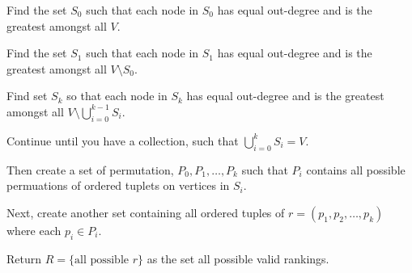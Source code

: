 \begin{soln}
	Find the set \(S_0\) such that each node in \(S_0\) has equal out-degree and is the greatest amongst all \(V\).

	Find the set \(S_1\) such that each node in \(S_1\) has equal out-degree and is the greatest amongst all \(V \setminus S_0\).

	Find set \(S_k\) so that each node in \(S_k\) has equal out-degree and is the greatest amongst all \(V \setminus \bigcup_{i=0}^{k-1}S_i\).

	Continue until you have a collection, such that \(\bigcup_{i = 0}^{k} S_i = V\).

	Then create a set of permutation, \(P_0, P_1, \dots, P_k\) such that \(P_i\) contains all possible permuations of ordered tuplets on vertices in \(S_i\).

	Next, create another set containing all ordered tuples of \(r = (p_1, p_2, \dots, p_k)\) where each \(p_i \in P_i\).

	Return \(R = \{\text{all possible } r\}\) as the set all possible valid rankings.

\end{soln}
